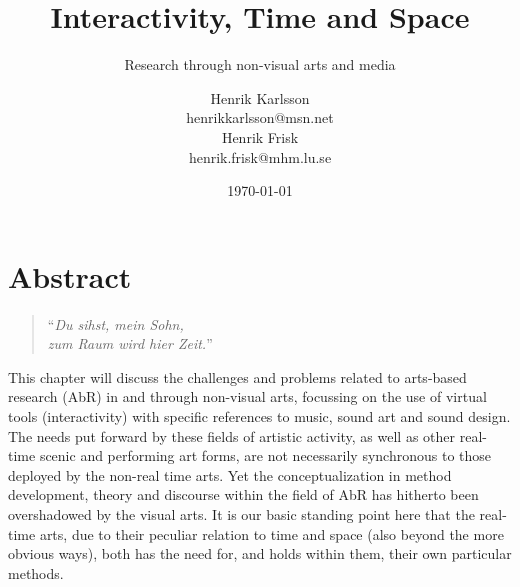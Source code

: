 \documentclass[a4paper]{article}
\title{Interactivity, Time and Space}
\subtitle{Research through non-visual arts and media}
\author{Henrik Karlsson\\{\small henrikkarlsson@msn.net}\\Henrik Frisk\\{\small henrik.frisk@mhm.lu.se}}
\date{\today}
\begin{document}
\maketitle

\thispagestyle{empty}


\section*{Abstract}
\label{sec:abstract}

\vspace{.8cm}

\begin{quotation}
  ``\emph{Du sihst, mein Sohn,\\
  zum Raum wird hier Zeit.}'' 
\end{quotation}



\vspace{.8cm}

This chapter will discuss the challenges and problems related to arts-based research (AbR) in and through non-visual arts, focussing on the use of virtual tools (interactivity) with specific references to music, sound art and sound design. The needs put forward by these fields of artistic activity, as well as other real-time scenic and performing art forms, are not necessarily synchronous to those deployed by the non-real time arts. Yet the conceptualization in method development, theory and discourse within the field of AbR has hitherto been overshadowed by the visual arts. It is our basic standing point here that the real-time arts, due to their peculiar relation to time and space (also beyond the more obvious ways), both has the need for, and holds within them, their own particular methods. 
\end{document}
